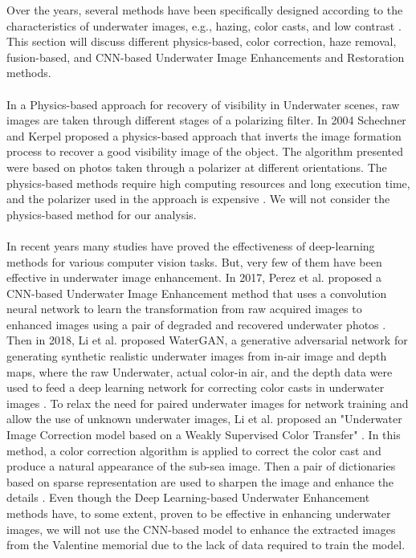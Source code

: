 \documentclass[a4paper,11pt,oneside]{article}
\begin{document}
  Over the years, several methods have been specifically designed according to the characteristics of underwater images, e.g., hazing, color casts, and low contrast \cite{15}. This section will discuss different physics-based, color correction, haze removal, fusion-based, and CNN-based Underwater Image Enhancements and Restoration methods.\\
  \\
  In a Physics-based approach for recovery of visibility in Underwater scenes, raw images are taken through different stages of a polarizing filter. In 2004 Schechner and Kerpel \cite{19} proposed a physics-based approach that inverts the image formation process to recover a good visibility image of the object. The algorithm presented were based on photos taken through a polarizer at different orientations. The physics-based methods require high computing resources and long execution time, and the polarizer used in the approach is expensive \cite{8}. We will not consider the physics-based method for our analysis.\\
  \\
  In recent years many studies have proved the effectiveness of deep-learning methods for various computer vision tasks. But, very few of them have been effective in underwater image enhancement. In 2017, Perez et al. \cite{22} proposed a CNN-based Underwater Image Enhancement method that uses a convolution neural network to learn the transformation from raw acquired images to enhanced images using a pair of degraded and recovered underwater photos \cite{15}. Then in 2018, Li et al. \cite{23} proposed WaterGAN, a generative adversarial network for generating synthetic realistic underwater images from in-air image and depth maps, where the raw Underwater, actual color-in air, and the depth data were used to feed a deep learning network for correcting color casts in underwater images \cite{15}. To relax the need for paired underwater images for network training and allow the use of unknown underwater images, Li et al. \cite{7} proposed an "Underwater Image Correction model based on a Weakly Supervised Color Transfer" \cite{15}. In this method, a color correction algorithm is applied to correct the color cast and produce a natural appearance of the sub-sea image. Then a pair of dictionaries based on sparse representation are used to sharpen the image and enhance the details \cite{7}. Even though the Deep Learning-based Underwater Enhancement methods have, to some extent, proven to be effective in enhancing underwater images, we will not use the CNN-based model to enhance the extracted images from the Valentine memorial due to the lack of data required to train the model.\\
\end{document}
